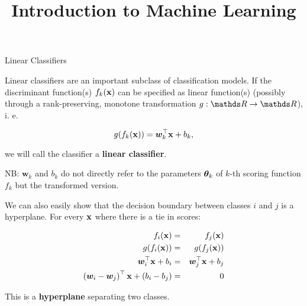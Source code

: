 \documentclass[11pt,compress,t,notes=noshow, xcolor=table]{beamer}
\title{Introduction to Machine Learning}
\begin{document}

\framebreak


\begin{vbframe}{Linear Classifiers}

Linear classifiers are an important subclass of classification models. 
If the discriminant function(s) $\fkx$ can be specified as linear function(s) (possibly through a rank-preserving,
monotone transformation $g: \R \to \R$), i. e. 

$$
  g(\fkx) = \bm{w}_k^\top \xv + b_k,
$$

we will call the classifier a \textbf{linear classifier}. 

\vfill

NB: $\bm{w}_k$ and $b_k$ do not directly refer to the parameters $\thetav_k$ 
of $k$-th scoring function $f_k$ but the transformed version. 

  

\framebreak
  

  
We can also easily show that the decision boundary between classes $i$ and $j$ is a hyperplane. For every $\xv$ where there is a tie in scores: 

\begin{eqnarray*}
  \fkx[i] &=& \fkx[j] \\
  g(\fkx[i]) &=& g(\fkx[j]) \\
  \bm{w}_i^\top \xv + b_i &=& \bm{w}_j^\top \xv + b_j \\
  \left(\bm{w}_i - \bm{w}_j\right)^\top \xv + \left(b_i - b_j\right) &=& 0 
\end{eqnarray*}

This is a \textbf{hyperplane} separating two classes. 




\end{vbframe}
\end{document}
